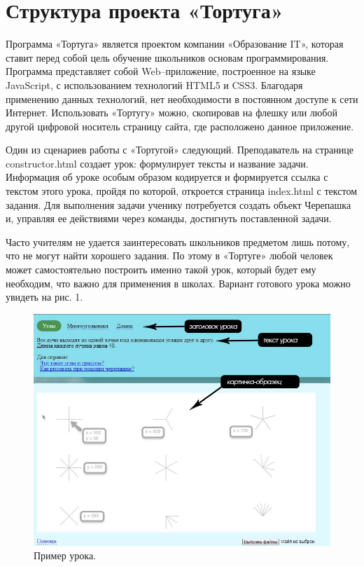 \renewcommand{\chaptername}{Глава}
\chapter{Структура проекта «Тортуга»} \label{chapt1}
Программа «Тортуга» является проектом компании «Образование IT», которая ставит перед собой цель обучение школьников основам программирования. Программа представляет собой Web–приложение, построенное на языке JavaScript, с использованием технологий HTML5 и CSS3. Благодаря применению данных технологий, нет необходимости в постоянном доступе к сети Интернет. Использовать «Тортугу» можно, скопировав на флешку или любой другой цифровой носитель страницу сайта, где расположено данное приложение.\par
Один из сценариев работы с «Тортугой» следующий. Преподаватель на странице constructor.html создает урок: формулирует тексты и название задачи. Информация об уроке особым образом кодируется и формируется ссылка с текстом этого урока, пройдя по которой, откроется страница index.html с текстом задания. Для выполнения задачи ученику потребуется создать объект Черепашка и, управляя ее действиями через команды, достигнуть поставленной задачи.\par
Часто учителям не удается заинтересовать школьников предметом лишь потому, что не могут найти хорошего задания. По этому в «Тортуге» любой человек может самостоятельно построить именно такой урок, который будет ему необходим, что важно для применения в школах. Вариант готового урока можно увидеть на рис. 1. 
\vspace{50mm}

\begin{figure} [h] 
  \center
  \includegraphics [scale=0.70,natwidth=826,natheight=645] {images/pic1.jpg}
  \caption{Пример урока.} 
  \label{img:pic1}  
\end{figure}


